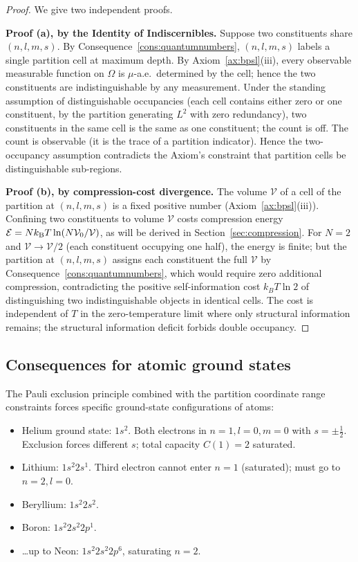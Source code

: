\begin{proof}
We give two independent proofs.

\textbf{Proof (a), by the Identity of Indiscernibles.} Suppose two constituents share $(n,l,m,s)$. By Consequence~\ref{cons:quantumnumbers}, $(n,l,m,s)$ labels a single partition cell at maximum depth. By Axiom~\ref{ax:bpsl}(iii), every observable measurable function on $\Omega$ is $\mu$-a.e.\ determined by the cell; hence the two constituents are indistinguishable by any measurement. Under the standing assumption of distinguishable occupancies (each cell contains either zero or one constituent, by the partition generating $L^{2}$ with zero redundancy), two constituents in the same cell is the same as one constituent; the count is off. The count is observable (it is the trace of a partition indicator). Hence the two-occupancy assumption contradicts the Axiom's constraint that partition cells be distinguishable sub-regions.

\textbf{Proof (b), by compression-cost divergence.} The volume $\mathcal{V}$ of a cell of the partition at $(n,l,m,s)$ is a fixed positive number (Axiom~\ref{ax:bpsl}(iii)). Confining two constituents to volume $\mathcal{V}$ costs compression energy $\mathcal{E}=Nk_{\mathrm{B}} T\ln(N\mathcal{V}_{0}/\mathcal{V})$, as will be derived in Section~\ref{sec:compression}. For $N=2$ and $\mathcal{V}\to\mathcal{V}/2$ (each constituent occupying one half), the energy is finite; but the partition at $(n,l,m,s)$ assigns each constituent the full $\mathcal{V}$ by Consequence~\ref{cons:quantumnumbers}, which would require zero additional compression, contradicting the positive self-information cost $k_{B}T\ln 2$ of distinguishing two indistinguishable objects in identical cells. The cost is independent of $T$ in the zero-temperature limit where only structural information remains; the structural information deficit forbids double occupancy.
\end{proof}

\subsection{Consequences for atomic ground states}

The Pauli exclusion principle combined with the partition coordinate range constraints forces specific ground-state configurations of atoms:
\begin{itemize}
\item Helium ground state: $1s^{2}$. Both electrons in $n=1,l=0,m=0$ with $s=\pm\tfrac{1}{2}$. Exclusion forces different $s$; total capacity $C(1)=2$ saturated.
\item Lithium: $1s^{2}2s^{1}$. Third electron cannot enter $n=1$ (saturated); must go to $n=2,l=0$.
\item Beryllium: $1s^{2}2s^{2}$.
\item Boron: $1s^{2}2s^{2}2p^{1}$.
\item \ldots up to Neon: $1s^{2}2s^{2}2p^{6}$, saturating $n=2$.
\end{itemize}


